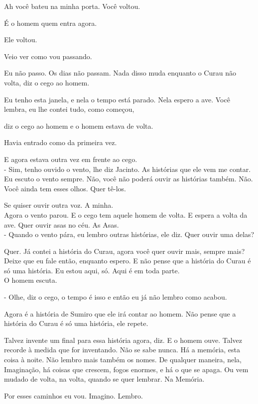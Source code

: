 Ah você bateu na minha porta. Você voltou.

É o homem quem entra agora.

Ele voltou.

Veio ver como vou passando.

Eu não passo. Os dias não passam. Nada disso muda enquanto o Curau não
volta, diz o cego ao homem.

Eu tenho esta janela, e nela o tempo está parado. Nela espero a ave.
Você lembra, eu lhe contei tudo, como começou,

diz o cego ao homem e o homem estava de volta.

Havia entrado como da primeira vez.

E agora estava outra vez em frente ao cego.\\

- Sim, tenho ouvido o vento, lhe diz Jacinto. As histórias que ele vem
me contar. Eu escuto o vento sempre. Não, você não poderá ouvir as
histórias também. Não. Você ainda tem esses olhos. Quer tê-los.

Se quiser ouvir outra voz. A minha.\\

Agora o vento parou. E o cego tem aquele homem de volta. E espera a
volta da ave. Quer ouvir asas no céu. As Asas.\\

- Quando o vento pára, eu lembro outras histórias, ele diz. Quer ouvir
uma delas?

Quer. Já contei a história do Curau, agora você quer ouvir mais, sempre
mais? Deixe que eu fale então, enquanto espero. E não pense que a
história do Curau é só uma história. Eu estou aqui, só. Aqui é em toda
parte.\\

O homem escuta.

- Olhe, diz o cego, o tempo é isso e então eu já não lembro como acabou.

Agora é a história de Sumiro que ele irá contar ao homem. Não pense que
a história do Curau é só uma história, ele repete.

Talvez invente um final para essa história agora, diz. E o homem ouve.
Talvez recorde à medida que for inventando. Não se sabe nunca. Há a
memória, esta coisa à noite. Não lembro mais também os nomes. De
qualquer maneira, nela, Imaginação, há coisas que crescem, fogos
enormes, e há o que se apaga. Ou vem mudado de volta, na volta, quando
se quer lembrar. Na Memória.

Por esses caminhos eu vou. Imagino. Lembro.

